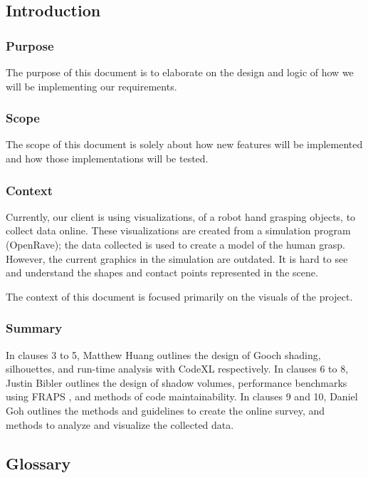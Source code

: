 \subsection{Introduction}
\begin{flushleft}

\subsubsection{Purpose}
The purpose of this document is to elaborate on the design and logic of how we will be implementing our requirements.

\subsubsection{Scope}
The scope of this document is solely about how new features will be implemented and how those implementations will be tested.

\subsubsection{Context}
Currently, our client is using visualizations, of a robot hand grasping objects, to collect data online.
These visualizations are created from a simulation program (OpenRave); the data collected is used to create a model of the human grasp.
However, the current graphics in the simulation are outdated.
It is hard to see and understand the shapes and contact points represented in the scene.

The context of this document is focused primarily on the visuals of the project.

\subsubsection{Summary}
In clauses 3 to 5, Matthew Huang outlines the design of Gooch shading, silhouettes, and run-time analysis with CodeXL respectively.
In clauses 6 to 8, Justin Bibler outlines the design of shadow volumes, performance benchmarks using FRAPS \cite{fraps}, and methods of code maintainability.
In clauses 9 and 10, Daniel Goh outlines the methods and guidelines to create the online survey, and methods to analyze and visualize the collected data.

\newpage




\subsection{Glossary}


\end{flushleft}
